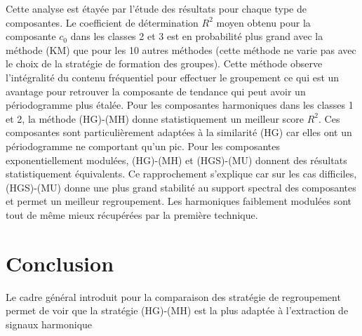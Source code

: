 \documentclass{gretsi}
\begin{document}
Cette analyse est étayée par l'étude des résultats pour chaque type de composantes.
Le coefficient de détermination $R^2$ moyen obtenu pour la composante $c_0$ dans les classes 2 et 3 est en probabilité plus grand avec la méthode (KM) que pour les 10 autres méthodes (cette méthode ne varie pas avec le choix de la stratégie de formation des groupes). 
Cette méthode observe l'intégralité du contenu fréquentiel pour effectuer le groupement ce qui est un avantage pour retrouver la composante de tendance qui peut avoir un périodogramme plus étalée. 
Pour les composantes harmoniques dans les classes 1 et 2, la méthode (HG)-(MH) donne statistiquement un meilleur score $R^2$. 
Ces composantes sont particulièrement adaptées à la similarité (HG) car elles ont un périodogramme ne comportant qu'un pic.
Pour les composantes exponentiellement modulées, (HG)-(MH) et (HGS)-(MU) donnent des résultats statistiquement équivalents. Ce rapprochement s'explique car sur les cas difficiles, (HGS)-(MU) donne une plus grand stabilité au support spectral des composantes et permet un meilleur regroupement. Les harmoniques faiblement modulées sont tout de même mieux récupérées par la première technique.



\section{Conclusion}
\label{sec:ccl}
Le cadre général introduit pour la comparaison des stratégie de regroupement permet de voir que la stratégie (HG)-(MH) est la plus adaptée à l'extraction de signaux harmonique


 
\scriptsize
{}
\end{document}
